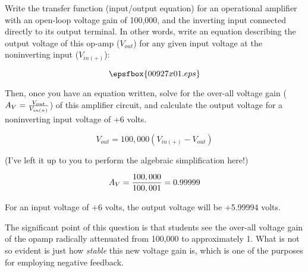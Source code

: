 

Write the transfer function (input/output equation) for an operational amplifier with an open-loop voltage gain of 100,000, and the inverting input connected directly to its output terminal.  In other words, write an equation describing the output voltage of this op-amp ($V_{out}$) for any given input voltage at the noninverting input ($V_{in(+)}$):

$$\epsfbox{00927x01.eps}$$

Then, once you have an equation written, solve for the over-all voltage gain ($A_V = {V_{out} \over V_{in(+)}}$) of this amplifier circuit, and calculate the output voltage for a noninverting input voltage of +6 volts.







$$V_{out} = 100,000(V_{in(+)} - V_{out})$$

(I've left it up to you to perform the algebraic simplification here!)

$$A_V = {100,000 \over 100,001} = 0.99999$$

\vskip 10pt

For an input voltage of +6 volts, the output voltage will be +5.99994 volts.







The significant point of this question is that students see the over-all voltage gain of the opamp radically attenuated from 100,000 to approximately 1.  What is not so evident is just how {\it stable} this new voltage gain is, which is one of the purposes for employing negative feedback.




